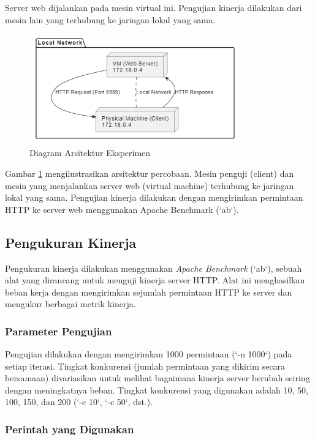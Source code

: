 \documentclass[12pt]{article}
\begin{document}
Server web dijalankan pada mesin virtual ini. Pengujian kinerja dilakukan dari mesin lain yang terhubung ke jaringan lokal yang sama. 

\begin{figure}[h!]
\centering
\includegraphics[width=0.8\textwidth]{img/architecture_diagram.png}
\caption{Diagram Arsitektur Eksperimen}
\label{fig:arch}
\end{figure}

Gambar \ref{fig:arch} mengilustrasikan arsitektur percobaan. Mesin penguji (client) dan mesin yang menjalankan server web (virtual machine) terhubung ke jaringan lokal yang sama. Pengujian kinerja dilakukan dengan mengirimkan permintaan HTTP ke server web menggunakan Apache Benchmark (`ab`). 

\subsection{Pengukuran Kinerja}

Pengukuran kinerja dilakukan menggunakan \textit{Apache Benchmark} (`ab`), sebuah alat yang dirancang untuk menguji kinerja server HTTP. Alat ini menghasilkan beban kerja dengan mengirimkan sejumlah permintaan HTTP ke server dan mengukur berbagai metrik kinerja. 

\subsubsection{Parameter Pengujian}

Pengujian dilakukan dengan mengirimkan 1000 permintaan (`-n 1000`) pada setiap iterasi. Tingkat konkurensi (jumlah permintaan yang dikirim secara bersamaan) divariasikan untuk melihat bagaimana kinerja server berubah seiring dengan meningkatnya beban. Tingkat konkurensi yang digunakan adalah 10, 50, 100, 150, dan 200 (`-c 10`, `-c 50`, dst.).

\subsubsection{Perintah yang Digunakan}
\end{document}
